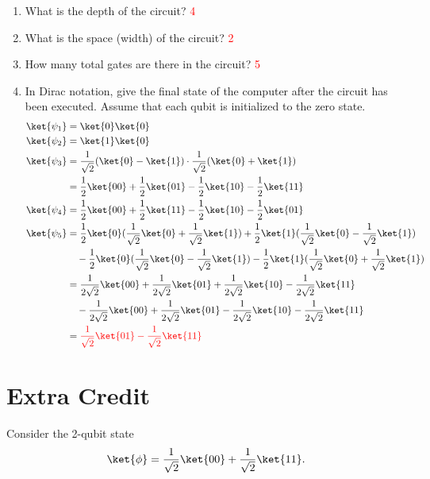 \documentclass[12pt]{article}
\begin{document}
\begin{enumerate}[label=\alph*)]
    \item What is the depth of the circuit?
        \textcolor{red}{4}
    \item What is the space (width) of the circuit?
        \textcolor{red}{2}
    \item How many total gates are there in the circuit?
        \textcolor{red}{5}
    \item In Dirac notation, give the final state of the computer after the circuit has been executed. Assume that each qubit is initialized to the zero state.
        \textcolor{mathRed}{
        \begin{align*}
            \ket{\psi_1} &= \ket{0}\ket{0} \\ 
            \ket{\psi_2} &= \ket{1}\ket{0} \\ 
            \ket{\psi_3} &= \frac{1}{\sqrt{2}}(\ket{0} - \ket{1}) \cdot \frac{1}{\sqrt{2}}(\ket{0} + \ket{1}) \\
            &= \frac{1}{2}\ket{00} + \frac{1}{2}\ket{01} - \frac{1}{2}\ket{10} - \frac{1}{2}\ket{11} \\
            \ket{\psi_4} &= \frac{1}{2}\ket{00} + \frac{1}{2}\ket{11} - \frac{1}{2}\ket{10} - \frac{1}{2}\ket{01} \\
            \ket{\psi_5} &= \frac{1}{2}\ket{0}(\frac{1}{\sqrt{2}}\ket{0} + \frac{1}{\sqrt{2}}\ket{1}) + \frac{1}{2}\ket{1}(\frac{1}{\sqrt{2}}\ket{0} - \frac{1}{\sqrt{2}}\ket{1}) \\ &\quad - \frac{1}{2}\ket{0}(\frac{1}{\sqrt{2}}\ket{0} - \frac{1}{\sqrt{2}}\ket{1}) - \frac{1}{2}\ket{1}(\frac{1}{\sqrt{2}}\ket{0} + \frac{1}{\sqrt{2}}\ket{1}) \\
            &= \frac{1}{2\sqrt{2}}\ket{00} + \frac{1}{2\sqrt{2}}\ket{01} + \frac{1}{2\sqrt{2}}\ket{10} - \frac{1}{2\sqrt{2}}\ket{11} \\ &\quad - \frac{1}{2\sqrt{2}}\ket{00} + \frac{1}{2\sqrt{2}}\ket{01} - \frac{1}{2\sqrt{2}}\ket{10} - \frac{1}{2\sqrt{2}}\ket{11} \\
            &= \textcolor{red}{\frac{1}{\sqrt{2}}\ket{01} - \frac{1}{\sqrt{2}}\ket{11}}
        \end{align*}
        }
\end{enumerate}

\section{Extra Credit}
Consider the 2-qubit state
\[
\ket{\phi} = \frac{1}{\sqrt{2}}\ket{00} + \frac{1}{\sqrt{2}}\ket{11}.
\]
\end{document}

